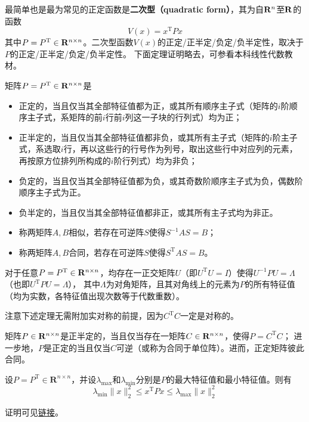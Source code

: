最简单也是最为常见的正定函数是{\bf 二次型（quadratic form）}，其为自$\mathbf{R}{}^n$至$\mathbf{R}{}$的函数\[V(x)=x^\mathrm{T}Px\]其中$P=P^\mathrm{T}\in\mathbf{R}{}^{n\times n}$。二次型函数$V(x)$的正定/正半定/负定/负半定性，取决于$P$的正定/正半定/负定/负半定性。
下面定理证明略去，可参看本科线性代数教材。
\begin{theorem}
  矩阵$P=P^\mathrm{T}\in\mathbf{R}{}^{n\times n}$是\begin{itemize}[leftmargin=1em]
    \item 正定的，当且仅当其全部特征值都为正，或其所有顺序主子式（矩阵的$i$阶顺序主子式，系矩阵的前$i$行前$i$列这一子块的行列式）均为正；
    \item 正半定的，当且仅当其全部特征值都非负，或其所有主子式（矩阵的$i$阶主子式，系选取$i$行，再以这些行的行号作为列号，取出这些行中对应列的元素，再按原方位排列所构成的$i$阶行列式）均为非负；
    \item 负定的，当且仅当其全部特征值都为负，或其奇数阶顺序主子式为负，偶数阶顺序主子式为正。
    \item 负半定的，当且仅当其全部特征值都非正，或其所有主子式均为非正。
  \end{itemize}
\end{theorem}
\begin{definition}[相似与合同]
  \begin{itemize}[leftmargin=1em]
    \item 称两矩阵$A,B$相似，若存在可逆阵$S$使得$S^{-1}AS=B$；
    \item 称两矩阵$A,B$合同，若存在可逆阵$S$使得$S^{\mathrm{T}}AS=B$。
  \end{itemize}
\end{definition}
\begin{theorem}[实对称矩阵的正交相似对角化]
  对于任意$P=P^\mathrm{T}\in\mathbf{R}{}^{n\times n}$，均存在一正交矩阵$U$（即$U^\mathrm{T}U=I$）使得$U^{-1}PU=\Lambda$（也即$U^{\mathrm{T}}PU=\Lambda$），
  其中$\Lambda$为对角矩阵，且其对角线上的元素为$P$的所有特征值（均为实数，各特征值出现次数等于代数重数）。
\end{theorem}
注意下述定理无需附加实对称的前提，因为$C^\mathrm{T}C$一定是对称的。
\begin{theorem}[正定、正半定矩阵的分解]
  矩阵$P\in\mathbf{R}{}^{n\times n}$是正半定的，当且仅当存在一矩阵$C\in\mathbf{R}{}^{n\times n}$，使得$P=C^\mathrm{T}C$；
  进一步地，$P$是正定的当且仅当$C$可逆（或称为合同于单位阵）。进而，正定矩阵彼此合同。
\end{theorem}
\begin{theorem}\label{rayleigh-ritz}
  设$P=P^{\mathrm{T}}\in\mathbf{R}^{n\times n}$，并设$\lambda_\mathrm{max}$和$\lambda_\mathrm{min}$分别是$P$的最大特征值和最小特征值。则有
\[\lambda_{\mathrm{min}}\|x\|_{2}^{2}\le x^{\mathrm{T}}Px\le \lambda_{\mathrm{max}}\|x\|_{2}^{2}\]
\end{theorem}
证明可见\href{https://oliverwu.top/file/rayleigh-ritz.pdf}{链接}。